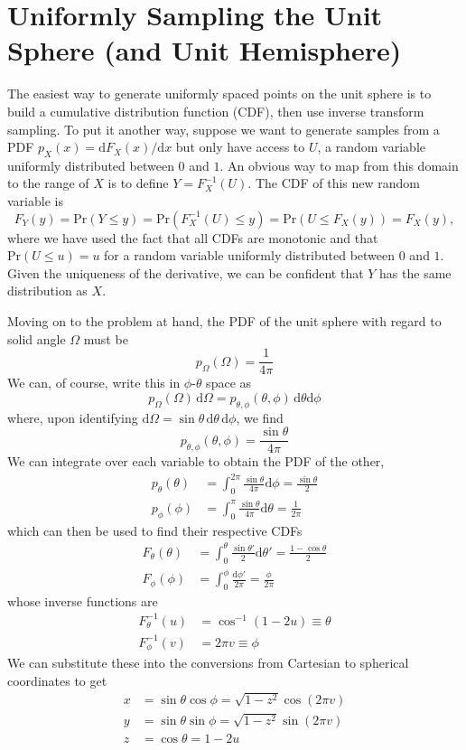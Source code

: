 \documentclass{article}
\begin{document}
\section*{Uniformly Sampling the Unit Sphere (and Unit Hemisphere)}

The easiest way to generate uniformly spaced points on the unit sphere is to build a cumulative distribution function (CDF), then use inverse transform sampling. To put it another way, suppose we want to generate samples from a PDF $p_X(x) = \mathrm{d}F_X(x)/\mathrm{d}x$ but only have access to $U$, a random variable uniformly distributed between $0$ and $1$. An obvious way to map from this domain to the range of $X$ is to define $Y = F_X^{-1}(U)$. The CDF of this new random variable is
\[
	F_Y(y) = \mathrm{Pr}(Y \leq y) = \mathrm{Pr}(F_X^{-1}(U) \leq y) = \mathrm{Pr}(U \leq F_X(y)) = F_X(y),
\]
where we have used the fact that all CDFs are monotonic and that $\mathrm{Pr}(U \leq u) = u$ for a random variable uniformly distributed between $0$ and $1$. Given the uniqueness of the derivative, we can be confident that $Y$ has the same distribution as $X$.

Moving on to the problem at hand, the PDF of the unit sphere with regard to solid angle $\Omega$ must be
\[
	p_\Omega(\Omega) = \frac{1}{4\pi}
\]
We can, of course, write this in $\phi$-$\theta$ space as
\[
	p_\Omega(\Omega)\,\mathrm{d}\Omega = p_{\theta,\phi}(\theta, \phi)\,\mathrm{d}\theta\mathrm{d}\phi
\]
where, upon identifying $\mathrm{d}\Omega = \sin\theta\,\mathrm{d}\theta\,\mathrm{d}\phi$, we find
\[
	p_{\theta,\phi}(\theta, \phi) = \frac{\sin\theta}{4\pi}
\]
We can integrate over each variable to obtain the PDF of the other,
\begin{align*}
	p_\theta(\theta) &= \int_0^{2\pi}\frac{\sin\theta}{4\pi}\mathrm{d}\phi = \frac{\sin\theta}{2} \\
	p_\phi(\phi) &= \int_0^{\pi}\frac{\sin\theta}{4\pi}\mathrm{d}\theta = \frac{1}{2\pi}
\end{align*}
which can then be used to find their respective CDFs
\begin{align*}
	F_\theta(\theta) &= \int_0^{\theta}\frac{\sin\theta'}{2}\mathrm{d}\theta' = \frac{1 - \cos\theta}{2} \\
	F_\phi(\phi) &= \int_0^{\phi}\frac{\mathrm{d}\phi'}{2\pi} = \frac{\phi}{2\pi}
\end{align*}
whose inverse functions are
\begin{align*}
	F_\theta^{-1}(u) &= \cos^{-1}(1 - 2u) \equiv \theta \\
	F_\phi^{-1}(v) &= 2\pi{v} \equiv \phi
\end{align*}
We can substitute these into the conversions from Cartesian to spherical coordinates to get
\begin{align*}
	x &= \sin\theta\cos\phi = \sqrt{1 - z^2}\cos(2\pi v) \\
	y &= \sin\theta\sin\phi = \sqrt{1 - z^2}\sin(2\pi v) \\
	z &= \cos\theta = 1 - 2u
\end{align*}
\end{document}
